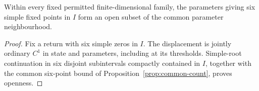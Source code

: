 \FloatBarrier

\begin{corollary}\label{cor:six-open}
Within every fixed permitted finite-dimensional family, the parameters
giving six simple fixed points in $I$ form an open subset of the
common parameter neighbourhood.
\end{corollary}

\begin{proof}
Fix a return with six simple zeros in $I$. The displacement is jointly
ordinary $C^1$ in state and parameters, including at its thresholds.
Simple-root continuation in six disjoint subintervals compactly
contained in $I$, together with the common six-point bound of
Proposition~\ref{prop:common-count}, proves openness.
\end{proof}

